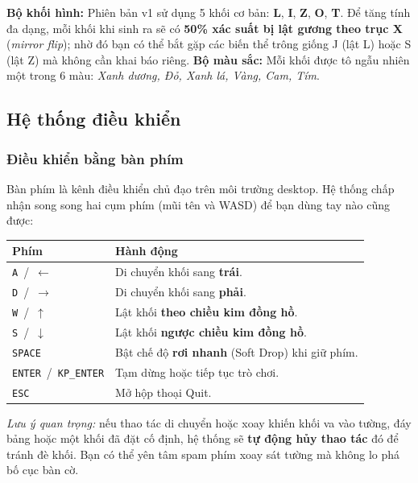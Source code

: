 \documentclass[12pt,a4paper]{article}
\begin{document}
\noindent\textbf{Bộ khối hình:} Phiên bản v1 sử dụng 5 khối cơ bản: \textbf{L}, \textbf{I}, \textbf{Z}, \textbf{O}, \textbf{T}.
Để tăng tính đa dạng, mỗi khối khi sinh ra sẽ có \textbf{50\% xác suất bị lật gương theo trục X} (\textit{mirror flip});
nhờ đó bạn có thể bắt gặp các biến thể trông giống J (lật L) hoặc S (lật Z) mà không cần khai báo riêng.
\noindent\textbf{Bộ màu sắc:} Mỗi khối được tô ngẫu nhiên một trong 6 màu: \textit{Xanh dương, Đỏ, Xanh lá, Vàng, Cam, Tím}.
\subsection{Hệ thống điều khiển}

\subsubsection{Điều khiển bằng bàn phím}
Bàn phím là kênh điều khiển chủ đạo trên môi trường desktop.
Hệ thống chấp nhận song song hai cụm phím (mũi tên và WASD) để bạn dùng tay nào cũng được:

\vspace{4pt}
\begin{tabularx}{\linewidth}{|l|X|}
    \hline
    \textbf{Phím} & \textbf{Hành động} \\
    \hline
    \texttt{A} \,/\, \texttt{$\leftarrow$}     & Di chuyển khối sang \textbf{trái}.
\\
    \hline
    \texttt{D} \,/\, \texttt{$\rightarrow$}    & Di chuyển khối sang \textbf{phải}.
\\
    \hline
    \texttt{W} \,/\, \texttt{$\uparrow$}       & Lật khối \textbf{theo chiều kim đồng hồ}.
\\
    \hline
    \texttt{S} \,/\, \texttt{$\downarrow$}     & Lật khối \textbf{ngược chiều kim đồng hồ}.
\\
    \hline
    \texttt{SPACE}                              & Bật chế độ \textbf{rơi nhanh} (Soft Drop) khi giữ phím.
\\
    \hline
    \texttt{ENTER} \,/\, \texttt{KP\_ENTER}     & Tạm dừng hoặc tiếp tục trò chơi.
\\
    \hline
    \texttt{ESC}                                & Mở hộp thoại Quit.
\\
    \hline
\end{tabularx}

\vspace{4pt}
\noindent\textit{Lưu ý quan trọng:} nếu thao tác di chuyển hoặc xoay khiến khối va vào tường, đáy bảng hoặc một khối đã đặt cố định, hệ thống sẽ \textbf{tự động hủy thao tác} đó để tránh đè khối.
Bạn có thể yên tâm spam phím xoay sát tường mà không lo phá bố cục bàn cờ.
\end{document}
